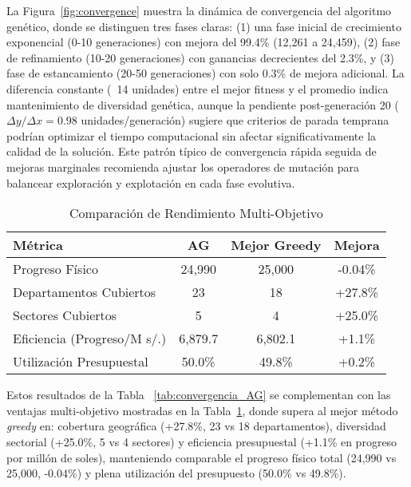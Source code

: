 \documentclass[12pt,a4paper]{article}
\begin{document}
La Figura~\ref{fig:convergence} muestra la dinámica de convergencia del algoritmo genético, donde se distinguen tres fases claras: (1) una fase inicial de crecimiento exponencial (0-10 generaciones) con mejora del 99.4\% (12,261 a 24,459), (2) fase de refinamiento (10-20 generaciones) con ganancias decrecientes del 2.3\%, y (3) fase de estancamiento (20-50 generaciones) con solo 0.3\% de mejora adicional. La diferencia constante (~14 unidades) entre el mejor fitness y el promedio indica mantenimiento de diversidad genética, aunque la pendiente post-generación 20 ($\Delta y/\Delta x = 0.98$ unidades/generación) sugiere que criterios de parada temprana podrían optimizar el tiempo computacional sin afectar significativamente la calidad de la solución. Este patrón típico de convergencia rápida seguida de mejoras marginales recomienda ajustar los operadores de mutación para balancear exploración y explotación en cada fase evolutiva.

\begin{table}[H]
\centering
\caption{Comparación de Rendimiento Multi-Objetivo}
\label{tab:multiobjective_comparison}
\begin{tabular}{@{}lccc@{}}
\toprule
\textbf{Métrica} & \textbf{AG} & \textbf{Mejor Greedy} & \textbf{Mejora} \\
\midrule
Progreso Físico & 24,990 & 25,000 & -0.04\% \\
Departamentos Cubiertos & 23 & 18 & +27.8\% \\
Sectores Cubiertos & 5 & 4 & +25.0\% \\
Eficiencia (Progreso/M s/.) & 6,879.7 & 6,802.1 & +1.1\% \\
Utilización Presupuestal & 50.0\% & 49.8\% & +0.2\% \\
\bottomrule
\end{tabular}
\end{table}

Estos resultados de la Tabla ~\ref{tab:convergencia_AG} se complementan con las ventajas multi-objetivo mostradas en la Tabla~\ref{tab:multiobjective_comparison}, donde supera al mejor método \textit{greedy} en: cobertura geográfica (+27.8\%, 23 vs 18 departamentos), diversidad sectorial (+25.0\%, 5 vs 4 sectores) y eficiencia presupuestal (+1.1\% en progreso por millón de soles), manteniendo comparable el progreso físico total (24,990 vs 25,000, -0.04\%) y plena utilización del presupuesto (50.0\% vs 49.8\%).
\end{document}
